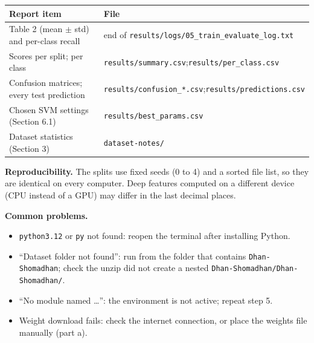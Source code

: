 \begin{center}
\small
\begin{tabular}{|p{5.6cm}|p{8.2cm}|}
\hline
\textbf{Report item} & \textbf{File} \\ \hline
Table 2 (mean $\pm$ std) and per-class recall & end of \texttt{results/logs/}\newline\texttt{05\_train\_evaluate\_log.txt} \\ \hline
Scores per split; per class & \texttt{results/summary.csv};\newline\texttt{results/per\_class.csv} \\ \hline
Confusion matrices; every test prediction & \texttt{results/confusion\_*.csv};\newline\texttt{results/predictions.csv} \\ \hline
Chosen SVM settings (Section 6.1) & \texttt{results/best\_params.csv} \\ \hline
Dataset statistics (Section 3) & \texttt{dataset-notes/} \\ \hline
\end{tabular}
\end{center}

\noindent\textbf{Reproducibility.} The splits use fixed seeds (0 to 4) and a
sorted file list, so they are identical on every computer. Deep features
computed on a different device (CPU instead of a GPU) may differ in the last
decimal places.

\noindent\textbf{Common problems.}
\begin{itemize}
\item \texttt{python3.12} or \texttt{py} not found: reopen the terminal after installing Python.
\item ``Dataset folder not found'': run from the folder that contains
\texttt{Dhan-Shomadhan}; check the unzip did not create a nested
\texttt{Dhan-Shomadhan/Dhan-Shomadhan/}.
\item ``No module named \ldots'': the environment is not active; repeat step 5.
\item Weight download fails: check the internet connection, or place the weights file manually (part a).
\end{itemize}




